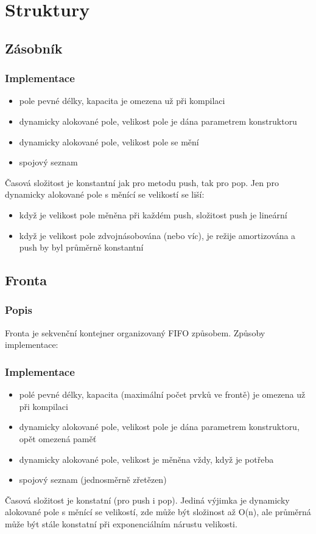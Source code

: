\documentclass{szzclass}
\begin{document}
\section{Struktury}
\subsection{Zásobník}
\subsubsection{Implementace}
\begin{itemize}
    \item pole pevné délky, kapacita je omezena už při kompilaci
    \item dynamicky alokované pole, velikost pole je dána parametrem konstruktoru
    \item dynamicky alokované pole, velikost pole se mění
    \item spojový seznam
\end{itemize}
Časová složitost je konstantní jak pro metodu push, tak pro pop. Jen pro dynamicky alokované pole s měnící se velikostí se liší:
\begin{itemize}
    \item když je velikost pole měněna při každém push, složitost push je lineární
    \item když je velikost pole zdvojnásobována (nebo víc), je režije amortizována a push by byl průměrně konstantní
\end{itemize}
\subsection{Fronta}
\subsubsection{Popis}
Fronta je sekvenční kontejner organizovaný FIFO způsobem. Způsoby implementace:
\subsubsection{Implementace}
\begin{itemize}
    \item polé pevné délky, kapacita (maximální počet prvků ve frontě) je omezena už při kompilaci
    \item dynamicky alokované pole, velikost pole je dána parametrem konstruktoru, opět omezená paměť
    \item dynamicky alokované pole, velikost je měněna vždy, když je potřeba
    \item spojový seznam (jednosměrně zřetězen)
\end{itemize}
Časová složitost je konstatní (pro push i pop). Jediná výjimka je dynamicky alokované pole s měnící se velikostí, zde
může být složinost až O(n), ale průměrná může být stále konstatní při exponenciálním nárustu velikosti.
\end{document}

